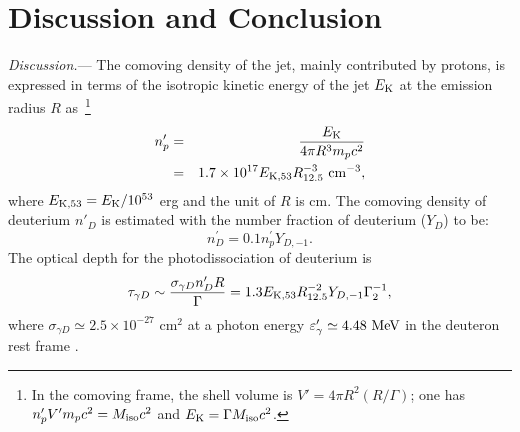 \documentclass[linenumbers,twocolumn]{aastex631}
\begin{document}
\section{Discussion and Conclusion}\label{sec:discussion}

\textit{Discussion.}--- The comoving density of the jet, mainly contributed by protons, is expressed in terms of the isotropic kinetic energy of the jet $E_{\rm K}$ at the emission radius $R$ as~\footnote{In the comoving frame, the shell volume is $V'=4\pi R^2 (R/\Gamma)$; one has $n^{\prime}_{p}V'm_pc^2=M_{\rm iso}c^2$ and $E_{\rm K}=\Gamma M_{\rm iso} c^2$.}
\begin{eqnarray}\label{eq:nbp}
 n^{\prime}_{p}&=&\frac{E_{\rm K}}{4\pi R^3 m_p c^2}\nonumber\\
     &=&1.7\times 10^{17} E_{\rm K,53} R_{12.5}^{-3} \ \rm cm^{-3} , \nonumber\\
\end{eqnarray}
where $E_{\rm K,53}=E_{\rm K}/10^{53}$ erg and the unit of $R$ is cm. The comoving density of deuterium $n'_{D}$ is estimated with the number fraction of deuterium ($Y_{D}$) to be:
\begin{equation}\label{eq:nDp}
   n^{\prime}_{ D}= 0.1 n^{\prime}_{p} Y_{D,-1}.
\end{equation}
The optical depth for the photodissociation of deuterium is 
\begin{equation}
  \tau_{\gamma D}\sim\frac{\sigma_{\gamma D} n'_ D R}{\Gamma}=1.3 E_{\rm K, 53} R_{12.5}^{-2} Y_{D,-1} \Gamma_2^{-1},
\end{equation}
where $\sigma_{\gamma D}\simeq 2.5\times10^{-27}$ cm$^{2}$ at a photon energy
$\varepsilon'_\gamma \simeq 4.48~{\rm MeV}$ in the deuteron rest frame \citep{IAEA2000}.
\end{document}
